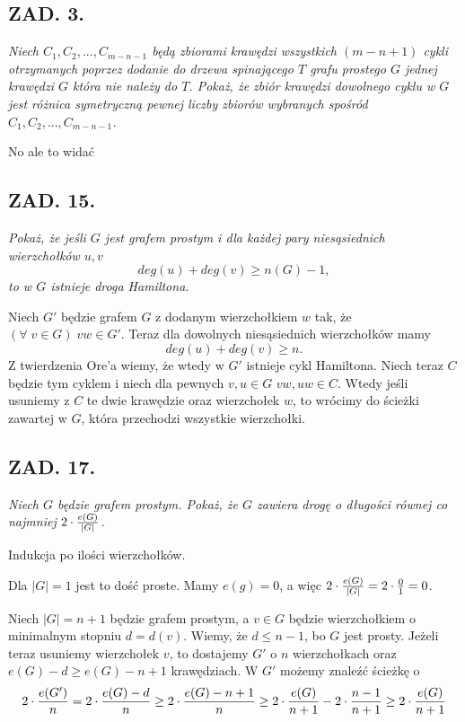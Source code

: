 \documentclass{article}
\begin{document}
\subsection*{ZAD. 3.}
\emph{Niech $C_1,C_2,...,C_{m-n-1}$ będą zbiorami krawędzi wszystkich $(m-n+1)$ cykli otrzymanych poprzez dodanie do drzewa spinającego $T$ grafu prostego $G$ jednej krawędzi $G$ która nie należy do $T$. Pokaż, że zbiór krawędzi dowolnego cyklu w $G$ jest różnica symetryczną pewnej liczby zbiorów wybranych spośród $C_1,C_2,...,C_{m-n-1}$.}
\medskip

\medskip

No ale to widać

\subsection*{ZAD. 15.}
\emph{Pokaż, że jeśli $G$ jest grafem prostym i dla każdej pary niesąsiednich wierzchołków $u,v$}
$$deg(u)+deg(v)\geq n(G)-1,$$
\emph{to w $G$ istnieje droga Hamiltona.}
\medskip

\medskip

Niech $G'$ będzie grafem $G$ z dodanym wierzchołkiem $w$ tak, że $(\forall\;v\in G)\;vw\in G'$. Teraz dla dowolnych niesąsiednich wierzchołków mamy
$$deg(u)+deg(v)\geq n.$$
Z twierdzenia Ore'a wiemy, że wtedy w $G'$ istnieje cykl Hamiltona. Niech teraz $C$ będzie tym cyklem i niech dla pewnych $v, u\in G$ $vw, uw\in C$. Wtedy jeśli usuniemy z $C$ te dwie krawędzie oraz wierzchołek $w$, to wrócimy do ścieżki zawartej w $G$, która przechodzi wszystkie wierzchołki.

\subsection*{ZAD. 17.}
\emph{Niech $G$ będzie grafem prostym. Pokaż, że $G$ zawiera drogę o długości równej co najmniej $2\cdot{e(G)\over |G|}$.}
\medskip

\medskip

Indukcja po ilości wierzchołków.
\smallskip

Dla $|G|=1$ jest to dość proste. Mamy $e(g)=0$, a więc $2\cdot{e(G)\over |G|}=2\cdot{0\over1}=0$.
\smallskip

Niech $|G|=n+1$ będzie grafem prostym, a $v\in G$ będzie wierzchołkiem o minimalnym stopniu $d=d(v)$. Wiemy, że $d\leq n-1$, bo $G$ jest prosty. Jeżeli teraz usuniemy wierzchołek $v$, to dostajemy $G'$ o $n$ wierzchołkach oraz $e(G)-d\geq e(G)-n+1$ krawędziach. W $G'$ możemy znaleźć ścieżkę o
$$2\cdot {e(G')\over n}=2\cdot{e(G)-d\over n}\geq 2\cdot {e(G)-n+1\over n}\geq2\cdot{e(G)\over n+1}-2\cdot{n-1\over n+1}\geq 2\cdot{e(G)\over n+1}$$
\end{document}
